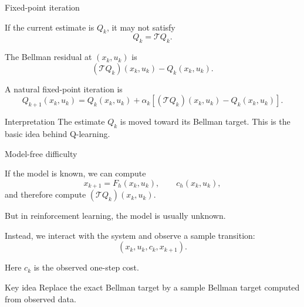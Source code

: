 \documentclass[aspectratio=169]{beamer}
\begin{document}
\begin{frame}{Fixed-point iteration}

If the current estimate is \(Q_k\), it may not satisfy
\[
Q_k=\mathcal TQ_k.
\]

\vspace{0.15cm}

The Bellman residual at \((x_k,u_k)\) is
\[
(\mathcal TQ_k)(x_k,u_k)-Q_k(x_k,u_k).
\]

\vspace{0.15cm}

A natural fixed-point iteration is
\[
Q_{k+1}(x_k,u_k)
=
Q_k(x_k,u_k)
+
\alpha_k
\left[
(\mathcal TQ_k)(x_k,u_k)-Q_k(x_k,u_k)
\right].
\]

\vspace{0.15cm}

\begin{block}{Interpretation}
\small
The estimate \(Q_k\) is moved toward its Bellman target.
This is the basic idea behind Q-learning.
\end{block}

\end{frame}


\begin{frame}{Model-free difficulty}

If the model is known, we can compute
\[
x_{k+1}=F_h(x_k,u_k),
\qquad
c_h(x_k,u_k),
\]
and therefore compute \((\mathcal TQ_k)(x_k,u_k)\).

\vspace{0.25cm}

But in reinforcement learning, the model is usually unknown.

\vspace{0.15cm}

Instead, we interact with the system and observe a sample transition:
\[
(x_k,u_k,c_k,x_{k+1}).
\]

\vspace{0.15cm}

Here \(c_k\) is the observed one-step cost.

\vspace{0.15cm}

\begin{alertblock}{Key idea}
\small
Replace the exact Bellman target by a sample Bellman target computed from observed data.
\end{alertblock}

\end{frame}
\end{document}
